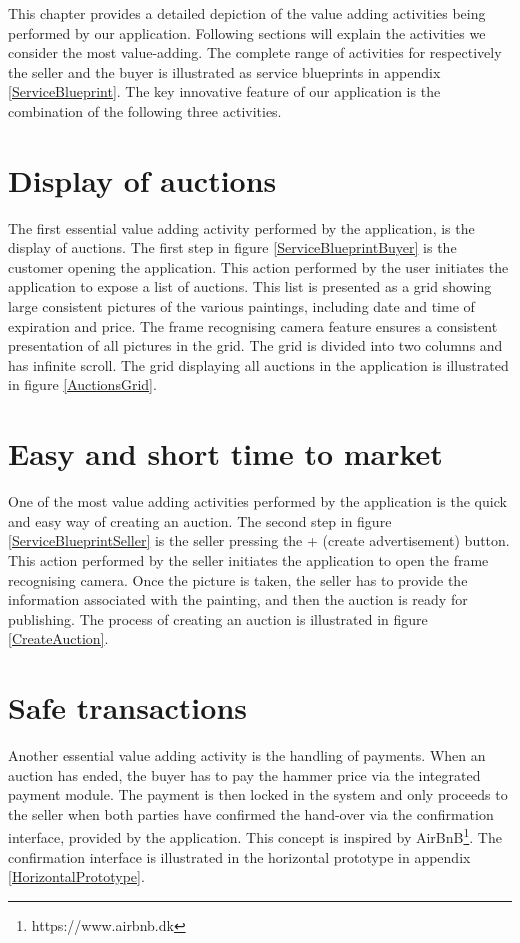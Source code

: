 This chapter provides a detailed depiction of the value adding activities being performed by our application. Following sections will explain the activities we consider the most value-adding. The complete range of activities for respectively the seller and the buyer is illustrated as service blueprints in appendix \ref{ServiceBlueprint}. The key innovative feature of our application is the combination of the following three activities. 

\section{Display of auctions}
\label{DisplayOfAuctions}
The first essential value adding activity performed by the application, is the display of auctions. The first step in figure \ref{ServiceBlueprintBuyer} is the customer opening the application. This action performed by the user initiates the application to expose a list of auctions. This list is presented as a grid showing large consistent pictures of the various paintings, including date and time of expiration and price. The frame recognising camera feature ensures a consistent presentation of all pictures in the grid. The grid is divided into two columns and has infinite scroll. The grid displaying all auctions in the application is illustrated in figure \ref{AuctionsGrid}.

\section{Easy and short time to market}
One of the most value adding activities performed by the application is the quick and easy way of creating an auction. The second step in figure \ref{ServiceBlueprintSeller} is the seller pressing the + (create advertisement) button. This action performed by the seller initiates the application to open the frame recognising camera. Once the picture is taken, the seller has to provide the information associated with the painting, and then the auction is ready for publishing. The process of creating an auction is illustrated in figure \ref{CreateAuction}. 

\section{Safe transactions}
Another essential value adding activity is the handling of payments. When an auction has ended, the buyer has to pay the hammer price via the integrated payment module. The payment is then locked in the system and only proceeds to the seller when both parties have confirmed the hand-over via the confirmation interface, provided by the application. This concept is inspired by AirBnB\footnote{https://www.airbnb.dk}. The confirmation interface is illustrated in the horizontal prototype in appendix \ref{HorizontalPrototype}.